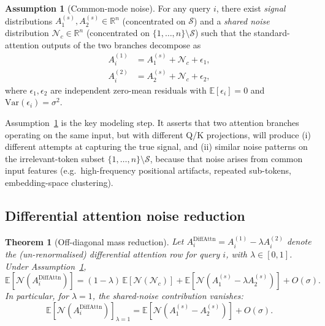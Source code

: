 \documentclass[11pt,a4paper]{article}
\newtheorem{theorem}{Theorem}
\theoremstyle{definition}
\newtheorem{assumption}{Assumption}
\theoremstyle{remark}
\newcommand{\R}{\mathbb{R}}
\newcommand{\E}{\mathbb{E}}
\newcommand{\diffattn}{\mathrm{DiffAttn}}
\newcommand{\Var}{\mathrm{Var}}
\begin{document}
\begin{assumption}[Common-mode noise]
\label{ass:commonmode}
For any query $i$, there exist \emph{signal} distributions
$A^{(s)}_1, A^{(s)}_2 \in \R^n$ (concentrated on $\mathcal{S}$) and a
\emph{shared noise} distribution $\mathcal{N}_c \in \R^n$
(concentrated on $\{1,\dots,n\} \setminus \mathcal{S}$)
such that the standard-attention outputs of the two branches decompose as
\begin{align}
A^{(1)}_i &= A^{(s)}_1 + \mathcal{N}_c + \epsilon_1, \\
A^{(2)}_i &= A^{(s)}_2 + \mathcal{N}_c + \epsilon_2,
\end{align}
where $\epsilon_1, \epsilon_2$ are independent zero-mean residuals with
$\E[\epsilon_i] = 0$ and $\Var(\epsilon_i) = \sigma^2$.
\end{assumption}

Assumption~\ref{ass:commonmode} is the key modeling step. It asserts that
two attention branches operating on the same input, but with different Q/K
projections, will produce (i) different attempts at capturing the true
signal, and (ii) similar noise patterns on the irrelevant-token subset
$\{1,\dots,n\} \setminus \mathcal{S}$, because that noise arises from
common input features (e.g.\ high-frequency positional artifacts, repeated
sub-tokens, embedding-space clustering).

\subsection{Differential attention noise reduction}

\begin{theorem}[Off-diagonal mass reduction]
\label{thm:diffattn}
Let $A^{\diffattn}_i = A^{(1)}_i - \lambda A^{(2)}_i$ denote the
(un-renormalised) differential attention row for query $i$, with
$\lambda \in [0, 1]$. Under Assumption~\ref{ass:commonmode},
\begin{equation}
\E[\mathcal{N}(A^{\diffattn}_i)]
    = (1 - \lambda) \, \E[\mathcal{N}(\mathcal{N}_c)]
    + \E[\mathcal{N}(A^{(s)}_1 - \lambda A^{(s)}_2)]
    + O(\sigma).
\end{equation}
In particular, for $\lambda = 1$, the shared-noise contribution vanishes:
\begin{equation}
\E[\mathcal{N}(A^{\diffattn}_i)]_{\lambda=1}
    = \E[\mathcal{N}(A^{(s)}_1 - A^{(s)}_2)] + O(\sigma).
\end{equation}
\end{theorem}
\end{document}
